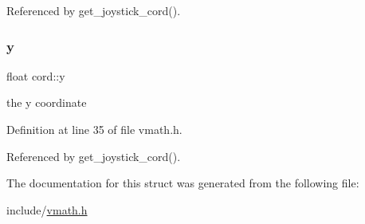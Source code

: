 Referenced by get\+\_\+joystick\+\_\+cord().

\mbox{\label{structcord_a4e7d289c55cfe511532e53a81dc19215}} 
\subsubsection{\texorpdfstring{y}{y}}
{\footnotesize\ttfamily float cord\+::y}

the y coordinate 

Definition at line 35 of file vmath.\+h.



Referenced by get\+\_\+joystick\+\_\+cord().



The documentation for this struct was generated from the following file\+:\begin{DoxyCompactItemize}
\item 
include/\hyperlink{vmath_8h}{vmath.\+h}\end{DoxyCompactItemize}
